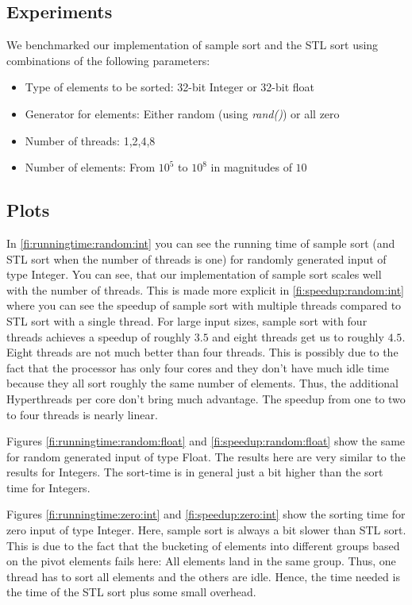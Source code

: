 \documentclass{llncs}
\begin{document}
\subsection{Experiments}
We benchmarked our implementation of sample sort and the STL sort using combinations of the following parameters:
\begin{itemize}
	\item Type of elements to be sorted: 32-bit Integer or 32-bit float
	\item Generator for elements: Either random  (using \emph{rand()}) or all zero
	\item Number of threads: 1,2,4,8
	\item Number of elements: From $10^5$ to $10^8$ in magnitudes of $10$
\end{itemize}

\subsection{Plots}
In \ref{fi:runningtime:random:int} you can see the running time of sample sort (and STL sort when the number of threads is one) for randomly generated input of type Integer. You can see, that our implementation of sample sort scales well with the number of threads. This is made more explicit in \ref{fi:speedup:random:int} where you can see the speedup of sample sort with multiple threads compared to STL sort with a single thread. For large input sizes, sample sort with four threads achieves a speedup of roughly $3.5$ and eight threads get us to roughly $4.5$. Eight threads are not much better than four threads. This is possibly due to the fact that the processor has only four cores and they don't have much idle time because they all sort roughly the same number of elements. Thus, the additional Hyperthreads per core don't bring much advantage. The speedup from one to two to four threads is nearly linear. \par
Figures \ref{fi:runningtime:random:float} and  \ref{fi:speedup:random:float} show the same for random generated input of type Float. The results here are very similar to the results for Integers. The sort-time is in general just a bit higher than the sort time for Integers. \par
Figures \ref{fi:runningtime:zero:int} and  \ref{fi:speedup:zero:int} show the sorting time for zero input of type Integer. Here, sample sort is always a bit slower than STL sort. This is due to the fact that the bucketing of elements into different groups based on the pivot elements fails here: All elements land in the same group. Thus, one thread has to sort all elements and the others are idle. Hence, the time needed is the time of the STL sort plus some small overhead. 
\end{document}
